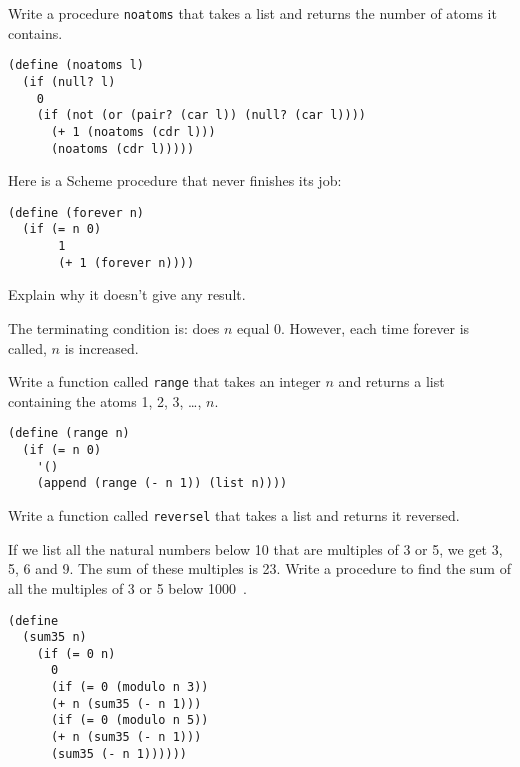 \begin{questions}
\question
Write a procedure \texttt{noatoms} that takes a list and returns the number of atoms it contains.

\begin{solution}
  \begin{verbatim}
(define (noatoms l)
  (if (null? l)
    0
    (if (not (or (pair? (car l)) (null? (car l))))
      (+ 1 (noatoms (cdr l)))
      (noatoms (cdr l)))))
  \end{verbatim}
\end{solution}

\question
Here is a Scheme procedure that never finishes its job:
\begin{verbatim}
(define (forever n)
  (if (= n 0)
       1
       (+ 1 (forever n))))
\end{verbatim}
Explain why it doesn’t give any result\cite{simplyscheme}.

\begin{solution}
The terminating condition is: does $n$ equal 0.
However, each time forever is called, $n$ is increased.
\end{solution}

\question
Write a function called \texttt{range} that takes an integer $n$ and returns a list containing the atoms 1, 2, 3, \ldots, $n$.

\begin{solution}
\begin{verbatim}
(define (range n)
  (if (= n 0)
    '()
    (append (range (- n 1)) (list n))))
\end{verbatim}
\end{solution}

\question
Write a function called \texttt{reversel} that takes a list and returns it reversed.  

\question
If we list all the natural numbers below 10 that are multiples of 3 or 5, we get 3, 5, 6 and 9.
The sum of these multiples is 23.
Write a procedure to find the sum of all the multiples of 3 or 5 below 1000~\cite{projecteuler}.

\begin{solution}
  \begin{verbatim}
(define 
  (sum35 n)
    (if (= 0 n)
      0
      (if (= 0 (modulo n 3))
      (+ n (sum35 (- n 1)))
      (if (= 0 (modulo n 5))
      (+ n (sum35 (- n 1)))
      (sum35 (- n 1))))))
  \end{verbatim}
\end{solution}


\end{questions}
